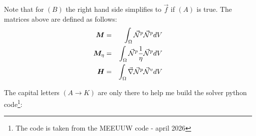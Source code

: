 Note that for $(B)$ the right hand side simplifies to $\vec{f}$ if $(A)$ is true.
The matrices above are defined as follows:
\begin{eqnarray}
{\bm M} &=& \int_\Omega \vec{{\mathcal{N}}}^p \vec{{\mathcal{N}}}^p dV \\
{\bm M}_\eta &=& \int_\Omega \vec{{\mathcal{N}}}^p \frac{1}{\eta} \vec{{\mathcal{N}}}^p dV \\
{\bm H} &=& \int_\Omega \vec\nabla \vec{{\mathcal{N}}}^p  \vec{{\mathcal{N}}}^v dV 
\end{eqnarray}

The capital letters $(A \rightarrow K)$ are only there to help me build the solver python code\footnote{
The code is taken from the MEEUUW code - april 2026}:





\newpage

